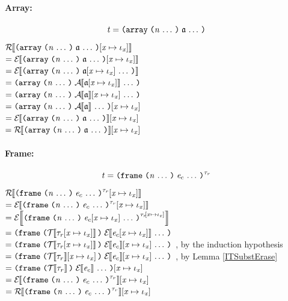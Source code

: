 \begin{sproof}
  \paragraph{Array:}
  \[\term = \arrlit{\sequence{\atom}}{\sequence{\nat}}\]
  $\EraseTrm{\idxsubst{\arrlit{\sequence{\atom}}{\sequence{\nat}}}}$ \\
  $= \EraseE{\idxsubst{\arrlit{\sequence{\atom}}{\sequence{\nat}}}}$ \\
  $= \EraseE{\arrlit{\sequence{\idxsubst\atom}}{\sequence{\nat}}}$ \\
  $= \arrlit{\sequence{\EraseA{\idxsubst{\atom}}}}{\sequence{\nat}}$ \\
  $= \arrlit{\sequence{\idxsubst{\EraseA{\atom}}}}{\sequence{\nat}}$ \\
  $= \idxsubst{\arrlit{\sequence{\EraseA{\atom}}}{\sequence{\nat}}}$ \\
  $= \idxsubst{\EraseE{\arrlit{\sequence{\atom}}{\sequence{\nat}}}}$ \\
  $= \idxsubst{\EraseTrm{\arrlit{\sequence{\atom}}{\sequence{\nat}}}}$ \\

  \paragraph{Frame:}
  \[\term = \notedfrm[\type_r]{\sequence{\expr_c}}{\sequence{\nat}}\]
  $\EraseTrm{\idxsubst{\notedfrm[\type_r]{\sequence{\expr_c}}{\sequence{\nat}}}}$ \\
  $= \EraseE{\idxsubst{\notedfrm[\type_r]{\sequence{\expr_c}}{\sequence{\nat}}}}$ \\
  $= \EraseE{\notedfrm[\idxsubst{\type_r}]{\sequence{\idxsubst{\expr_c}}}{\sequence{\nat}}}$ \\
  $= \frm{\sequence{\EraseE{\idxsubst{\expr_c}}}}{\EraseT{\idxsubst{\type_r}}}$ \\
  $= \frm{\sequence{\idxsubst{\EraseE{\expr_c}}}}{\EraseT{\idxsubst{\type_r}}}$%
  , by the induction hypothesis \\
  $= \frm{\sequence{\idxsubst{\EraseE{\expr_c}}}}{\idxsubst{\EraseT{\type_r}}}$%
  , by Lemma \ref{ITSubstErase} \\
  $= \idxsubst{\frm{\sequence{\EraseE{\expr_c}}}{\EraseT{\type_r}}}$ \\
  $= \idxsubst{\EraseE{\notedfrm[\type_r]{\sequence{\expr_c}}{\sequence{\nat}}}}$ \\
  $= \idxsubst{\EraseTrm{\notedfrm[\type_r]{\sequence{\expr_c}}{\sequence{\nat}}}}$ \\


\end{sproof}
